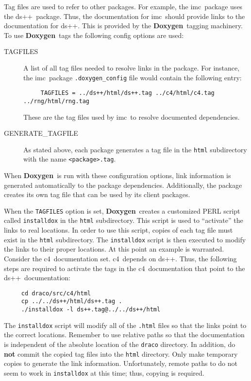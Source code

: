 \documentclass[11pt]{nmemo}
\newcommand{\doxy}{{\normalfont\bfseries Doxygen}}
\newcommand{\imc}{{\normalfont\sffamily imc}}
\newcommand{\dsxx}{{\normalfont\sffamily ds++}}
\newcommand{\cfour}{{\normalfont\sffamily c4}}
\begin{document}
Tag files are used to refer to other packages. For example, the \imc\
package uses the \dsxx\ package.  Thus, the documentation for \imc\
should provide links to the documentation for \dsxx.  This is provided 
by the \doxy\ tagging machinery.  To use \doxy\ tags the following
config options are used:
\begin{description}

\item[\ttfamily TAGFILES] A list of all tag files needed to resolve
  links in the package.  For instance, the \imc\ package
  \texttt{.doxygen\_config} file would contain the following entry:
\begin{verbatim}
     TAGFILES = ../ds++/html/ds++.tag ../c4/html/c4.tag ../rng/html/rng.tag
\end{verbatim}
  These are the tag files used by \imc\ to resolve documented
  dependencies.

\item[\ttfamily GENERATE\_TAGFILE] As stated above, each package
  generates a tag file in the \texttt{html} subdirectory with the name 
  \texttt{<package>.tag}.

\end{description}
When \doxy\ is run with these configuration options, link information
is generated automatically to the package dependencies.  Additionally, 
the package creates its own tag file that can be used by its client
packages.

When the \texttt{TAGFILES} option is set, \doxy\ creates a customized
PERL script called \texttt{installdox} in the \texttt{html}
subdirectory.  This script is used to ``activate'' the links to real
locations.  In order to use this script, copies of each tag file must
exist in the \texttt{html} subdirectory.  The \texttt{installdox}
script is then executed to modify the links to their proper locations.
At this point an example is warranted.  Consider the \cfour\ 
documentation set.  \cfour\ depends on \dsxx.  Thus, the following
steps are required to activate the tags in the \cfour\ documentation
that point to the \dsxx\ documentation:
\begin{verbatim}
     cd draco/src/c4/html
     cp ../../ds++/html/ds++.tag .
     ./installdox -l ds++.tag@../../ds++/html
\end{verbatim}
The \texttt{installdox} script will modify all of the \texttt{.html}
files so that the links point to the correct locations.  Remember to
use relative paths so that the documentation is independent of the
absolute location of the \texttt{draco} directory.  In addition, do
{\bf not} commit the copied tag files into the \texttt{html}
directory.  Only make temporary copies to generate the link
information.  Unfortunately, remote paths to do not seem to work in
\texttt{installdox} at this time; thus, copying is required.
\end{document}
